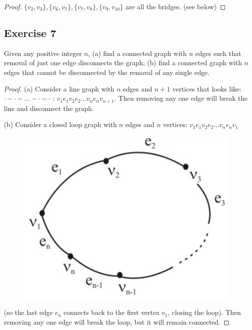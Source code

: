 \documentclass[14pt]{extarticle}
\begin{document}
\begin{proof}
    \(\{v_2, v_3\}, \{v_6, v_7\}, \{v_7, v_8\}, \{v_9, v_{10}\}\) are all the bridges. (see below)
\end{proof}

\subsection{Exercise 7}
Given any positive integer \(n\), (a) find a connected graph with \(n\) edges such that removal of just one edge
disconnects the graph; (b) find a connected graph with \(n\) edges that cannot be disconnected by the removal of any
single edge.

\begin{proof}
    (a) Consider a line graph with \(n\) edges and \(n+1\) vertices that looks like: \\\(\cdot-\cdot-\ldots-\cdot-\cdot\)
    : \(v_1e_1v_2e_2 \ldots v_ne_nv_{n+1}\). Then removing any one edge will break the line and disconnect the graph.

    (b) Consider a closed loop graph with \(n\) edges and \(n\) vertices: \(v_1e_1v_2e_2 \ldots v_ne_nv_1\)

    \begin{figure}[ht!]
        \centering
        \includegraphics[scale=0.2]{../images/10.1.7.png}
    \end{figure}

    (so the last edge \(e_n\) connects back to the first vertex \(v_1\), closing the loop). Then removing any one edge will
    break the loop, but it will remain connected.
\end{proof}
\end{document}
